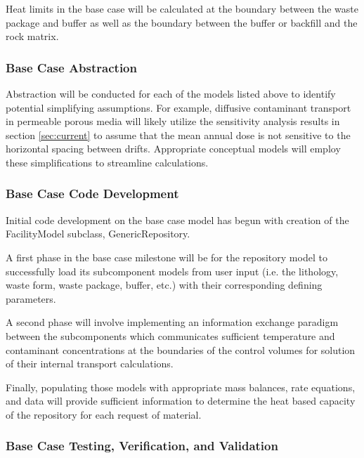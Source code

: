 
      Heat limits in the base case will be calculated at the boundary between 
      the waste package and buffer as well as the boundary between the buffer or  
      backfill and the rock matrix.

\subsubsection{Base Case Abstraction }


  Abstraction will be conducted for each of the models listed above to identify  
  potential simplifying assumptions. For example, diffusive contaminant 
  transport in  permeable porous media will likely utilize the sensitivity 
  analysis results in section \ref{sec:current} to assume that the mean annual 
  dose is not sensitive to the horizontal spacing between drifts. Appropriate 
  conceptual models will employ these simplifications to streamline 
  calculations. 

\subsubsection{Base Case Code Development}

  
  Initial code development on the base case model has begun with creation of the 
  FacilityModel subclass, GenericRepository. 

  A first phase in the base case milestone will be for the repository model to 
  successfully load its subcomponent models from user input (i.e.  the 
  lithology, waste form, waste package, buffer, etc.) with their corresponding 
  defining parameters.  

  A second phase will involve implementing an information exchange paradigm 
  between the subcomponents which communicates sufficient temperature and 
  contaminant concentrations at the boundaries of the control volumes for 
  solution of their internal transport calculations.
  
  Finally, populating those models with appropriate mass balances, rate
  equations, and data will provide sufficient information to determine the heat  
  based capacity of the repository for each request of material. 
  
\subsubsection{Base Case Testing, Verification, and Validation}

